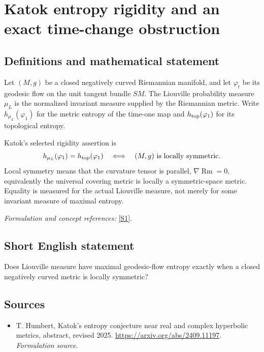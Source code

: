 \documentclass[11pt]{article}
\begin{document}
\section*{\texorpdfstring{Katok entropy rigidity and an exact time-change obstruction}{Katok entropy rigidity and an exact time-change obstruction}}\label{20001890}
\subsection{Definitions and mathematical statement}
Let $(M,g)$ be a closed negatively curved Riemannian manifold, and let $\varphi_t$ be its geodesic flow on the unit tangent bundle $SM$. The Liouville probability measure $\mu_L$ is the normalized invariant measure supplied by the Riemannian metric. Write $h_{\mu_L}(\varphi_1)$ for the metric entropy of the time-one map and $h_{\rm top}(\varphi_1)$ for its topological entropy.

Katok's selected rigidity assertion is
\[
 h_{\mu_L}(\varphi_1)=h_{\rm top}(\varphi_1)
 \quad\Longleftrightarrow\quad (M,g)\text{ is locally symmetric}.
\]
Local symmetry means that the curvature tensor is parallel, $\nabla\operatorname{Rm}=0$, equivalently the universal covering metric is locally a symmetric-space metric. Equality is measured for the actual Liouville measure, not merely for some invariant measure of maximal entropy.
\par\smallskip\textit{Formulation and concept references:} \href{https://arxiv.org/abs/2409.11197}{[S1]}.

\subsection{Short English statement}
Does Liouville measure have maximal geodesic-flow entropy exactly when a closed negatively curved metric is locally symmetric?
\subsection{Sources}
\begin{itemize}
\item[S1]T. Humbert, Katok's entropy conjecture near real and complex hyperbolic metrics, abstract, revised 2025.
\url{https://arxiv.org/abs/2409.11197}.
\textit{Formulation source.}
\end{itemize}
\end{document}
